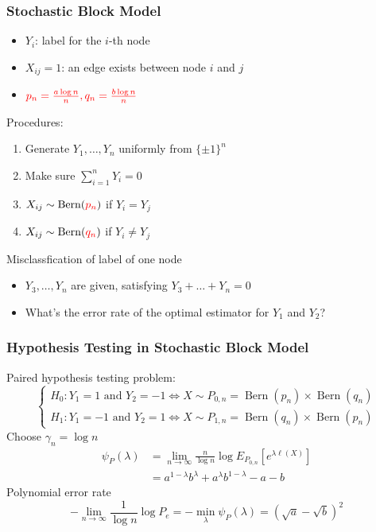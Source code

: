 \documentclass{beamer}
\DeclareMathOperator{\Bern}{Bern}
\begin{document}
\begin{frame}
\frametitle{
Stochastic Block Model}
\begin{itemize}
\item $Y_i$: label for the $i$-th node
\item $X_{ij}=1$: an edge exists between node $i$ and $j$
\item $\color{red}  p_n=\frac{a \log n}{n}, q_n =\frac{b \log n}{n} $
\end{itemize}
Procedures:
\begin{enumerate}
\item Generate $Y_1, \dots, Y_n$ uniformly from $\{\pm 1\}^n$
\item Make sure $\sum_{i=1}^n Y_i = 0$
\item $X_{ij} \sim \Bern(\textcolor{red} {p_n} ) $ if $Y_i=Y_j$
\item $X_{ij} \sim \Bern(\textcolor{red}{q_n} ) $ if $Y_i \neq Y_j$
\end{enumerate}
Misclassfication of label of one node
\begin{itemize}
\item $Y_3, \dots, Y_n$ are given, satisfying $Y_3 + \dots + Y_n  = 0$
\item What's the error rate of the optimal estimator for $Y_1$ and $Y_2$?
\end{itemize}
\end{frame}
\begin{frame}
\frametitle{
Hypothesis Testing in Stochastic Block Model} 
Paired hypothesis testing problem:
\begin{equation*}
\begin{cases}
H_0: Y_1 = 1 \textrm{ and } Y_2 = -1 \iff X \sim P_{0,n} = \Bern(p_n) \times \Bern(q_n)\\
H_1: Y_1 = -1 \textrm{ and } Y_2 = 1 \iff X \sim P_{1,n} = \Bern(q_n) \times \Bern(p_n)
\end{cases}
\end{equation*}
Choose $\gamma_n = \log n$
\begin{align*}
\psi_P(\lambda) &= \lim_{n\to \infty} \frac{n}{\log n} \log E_{P_{0,n}} [e^{\lambda \ell(X)}]\\
&=a^{1-\lambda}b^{\lambda}
+a^{\lambda}b^{1-\lambda} -a-b
\end{align*}
Polynomial error rate
\begin{equation*}
-\lim_{n\to\infty} \frac{1}{\log n}\log P_e = -\min_{\lambda} \psi_P(\lambda) = (\sqrt{a}-\sqrt{b})^2
\end{equation*}
\end{frame}
\end{document}
